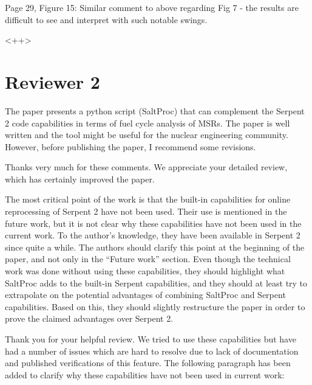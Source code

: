 \documentclass[answers,11pt]{exam}
\begin{document}
\begin{questions}
        \question  Page 29, Figure 15: Similar comment to above regarding Fig 7 
        - the results are difficult to see and interpret with such notable 
        swings.
        \begin{solution}
                <++>
        \end{solution}





        \section*{Reviewer 2}

        \question The paper presents a python script (SaltProc) that can 
        complement the Serpent 2 code capabilities in terms of fuel cycle 
        analysis of MSRs. The paper is well written and the tool might be 
        useful for the nuclear engineering community. However, before 
        publishing the paper, I recommend some revisions.
        \begin{solution}
                Thanks very much for these comments. We appreciate your 
                detailed review, which has certainly improved the paper.
        \end{solution}


        \question \label{built-in} The most critical point of the work is that the built-in 
        capabilities for online reprocessing of Serpent 2 have not been used. 
        Their use is mentioned in the future work, but it is not clear why 
        these capabilities have not been used in the current work. To the 
        author's knowledge, they have been available in Serpent 2 since quite a 
        while. The authors should clarify this point at the beginning of the 
        paper, and not only in the ``Future work'' section. Even though the 
        technical work was done without using these capabilities, they should 
        highlight what  SaltProc adds to the built-in Serpent capabilities, and 
        they should at least try to extrapolate on the potential advantages of 
        combining  SaltProc and Serpent capabilities. Based on this, they 
        should slightly restructure the paper in order to prove the claimed 
        advantages over Serpent 2.
        \begin{solution}
                Thank you for your helpful review. We tried to use these capabilities 
                \cite{rykhlevskii_online_2017} but have had a number of issues which 
                are hard to resolve due to lack of documentation and 
                published verifications of this feature. The following 
                paragraph has been added to clarify why these capabilities have 
                not been used in current work:
                

\end{solution}
\end{questions}
\end{document}
